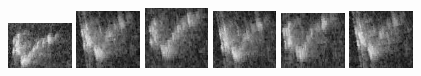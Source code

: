 \begin{figure}
    \includegraphics[width=0.15\textwidth]{chapters/images/dataset/all-class-images/hook/hook-110.jpg}
    \includegraphics[width=0.15\textwidth]{chapters/images/dataset/all-class-images/hook/hook-72.jpg}    
    \includegraphics[width=0.15\textwidth]{chapters/images/dataset/all-class-images/hook/hook-50.jpg}
    \includegraphics[width=0.15\textwidth]{chapters/images/dataset/all-class-images/hook/hook-71.jpg}
    \includegraphics[width=0.15\textwidth]{chapters/images/dataset/all-class-images/hook/hook-87.jpg}
    \includegraphics[width=0.15\textwidth]{chapters/images/dataset/all-class-images/hook/hook-75.jpg}
    

\end{figure}
